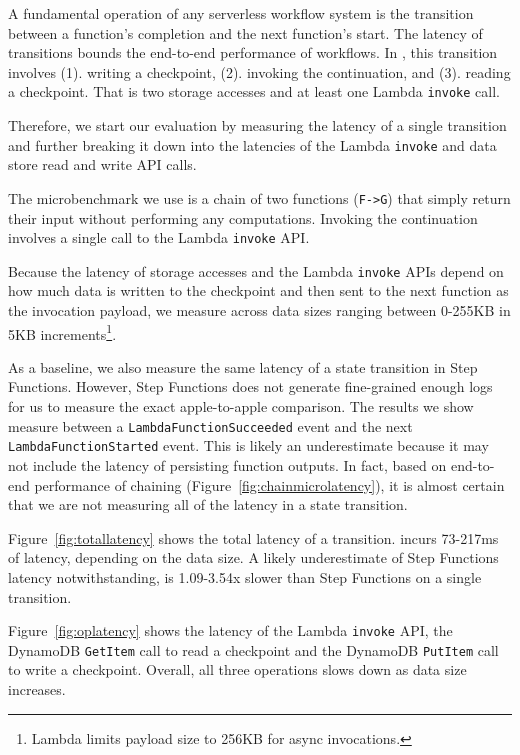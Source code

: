 A fundamental operation of any serverless workflow system is the transition
between a function's completion and the next function's start. The latency
of transitions bounds the end-to-end performance of workflows. In \name{},
this transition involves (1). writing a checkpoint, (2). invoking the
continuation, and (3). reading a checkpoint. That is two storage accesses and
at least one Lambda \texttt{invoke} call.

Therefore, we start our evaluation by measuring the latency of a single
transition and further breaking it down into the latencies of the Lambda
\texttt{invoke} and data store read and write API calls.

The microbenchmark we use is a chain of two functions (\texttt{F->G}) that
simply return their input without performing any computations. Invoking the
continuation involves a single call to the Lambda \texttt{invoke} API.

Because the latency of storage accesses and the Lambda \texttt{invoke} APIs
depend on how much data is written to the checkpoint and then sent to the next
function as the invocation payload, we measure across data sizes ranging
between 0-255KB in 5KB increments\footnote{Lambda limits payload size to 256KB
for async invocations.}.

As a baseline, we also measure the same latency of a state transition in Step
Functions. However, Step Functions does not generate fine-grained enough logs
for us to measure the exact apple-to-apple comparison. The results we show
measure between a \texttt{LambdaFunctionSucceeded} event and the next
\texttt{LambdaFunctionStarted} event. This is likely an underestimate because
it may not include the latency of persisting function outputs. In fact, based
on end-to-end performance of chaining (Figure~\ref{fig:chainmicrolatency}), it
is almost certain that we are not measuring all of the latency in a state
transition.

Figure~\ref{fig:totallatency} shows the total latency of a transition. \name{}
incurs 73-217ms of latency, depending on the data size. A likely underestimate
of Step Functions latency notwithstanding, \name{} is 1.09-3.54x slower than
Step Functions on a single transition. 

Figure~\ref{fig:oplatency} shows the latency of the Lambda \texttt{invoke}
API, the DynamoDB \texttt{GetItem} call to read a checkpoint and the DynamoDB
\texttt{PutItem} call to write a checkpoint. Overall, all three operations
slows down as data size increases.


